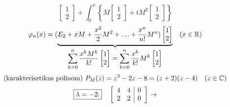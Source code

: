 \documentclass[a4paper,11.5pt]{article}
\begin{document}
\begin{task}
\[\begin{bmatrix}
			1\\
			2
		\end{bmatrix}+\int_0^x\left\{ M \begin{bmatrix}
			1\\
			2
		\end{bmatrix}+ tM^2 \begin{bmatrix}
			1\\
			2
		\end{bmatrix} \right\} \]
		\[\displaystyle  \varphi_n(x)=(\underbrace{E_2+xM+\frac{x^2}{2}M^2+\ldots+\frac{x^n}{n!}M^n) \begin{bmatrix}
			1\\
			2
		\end{bmatrix}}_{\displaystyle 
			\sum_{k=0}^n\frac{x^kM^k}{k!} \begin{bmatrix}
				1\\
				2
			\end{bmatrix}=\sum_{k=0}^n\frac{x^k}{k!}M^k \begin{bmatrix}
				1\\
				2
			\end{bmatrix}
		}\quad (x\in\mathbb{R}) \]
		\[ \text{(karakterisztikus polinom) }P_M(z)=z^2-2z-8=(z+2)(z-4)\quad (z\in\mathbb{C}) \]
		\[ \text{\fbox{$\lambda=-2$:}}\quad 
		\left[\begin{array}{cc|c}
			4&4&0\\
			2&2&0
		\end{array}\right]\to \]
	\end{task}
\end{document}
